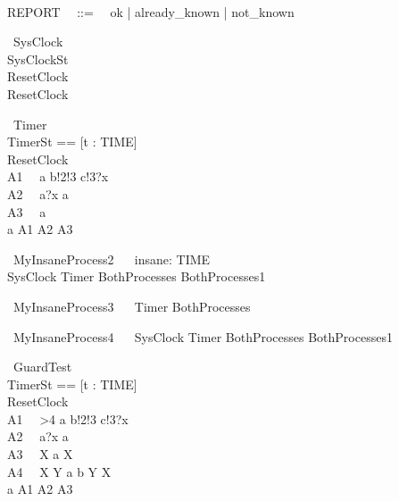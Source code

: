 \documentclass{llncs}
\begin{document}
\begin{zed}
\\
REPORT ~~::=~~ ok | already\_known | not\_known\\
\end{zed}
\begin{circus}
\circprocess ~SysClock ~\circdef~
\circbegin\\
  \circstate SysClockSt \\
  ResetClock ~\circdef~\Skip\\
  \circspot ResetClock\\
  \circend
\end{circus}
\begin{circus}
\circprocess ~Timer ~\circdef~
\circbegin\\
  \circstate TimerSt == [t : TIME]\\
  ResetClock ~\circdef~\Skip\\
  A1 ~\circdef~a \then b!2!3 \then c!3?x \then \Skip\\
  A2 ~\circdef~a?x \then a \then \Skip\\
  A3 ~\circdef~a \then \Skip\\
  \circspot a \then A1 \intchoice A2 \circseq A3\\
  \circend
\end{circus}

\begin{circus}
\circprocess ~MyInsaneProcess2 ~\circdef~ \Semi insane: TIME \circspot \\
		SysClock \extchoice Timer \circseq BothProcesses \intchoice BothProcesses1\\
\end{circus}
\begin{circus}

\circprocess ~MyInsaneProcess3 ~\circdef~
		Timer \lpar \lchanset \rchanset \rpar BothProcesses\\
\end{circus}
\begin{circus}

\circprocess ~MyInsaneProcess4 ~\circdef~
    SysClock \extchoice Timer \lpar \lchanset \rchanset \rpar BothProcesses \intchoice BothProcesses1\\
\end{circus}

\begin{circus}
\circprocess ~GuardTest ~\circdef~
\circbegin\\
  \circstate TimerSt == [t : TIME]\\
  ResetClock ~\circdef~\Skip\\
  A1 ~\circdef~>4 \rcircguard \circguard a \then b!2!3 \then c!3?x \then \Skip\\
  A2 ~\circdef~a?x \then a \then \Skip\\
  A3 ~\circdef~\circmu X \circspot a \then \Skip \circseq X\\
  A4 ~\circdef~\circmu X \circspot \circmu Y \circspot a \then \Skip \extchoice b \then \Skip \circseq Y \circseq X\\
  \circspot a \then A1 \intchoice A2 \circseq A3\\
  \circend
\end{circus}
\end{document}
